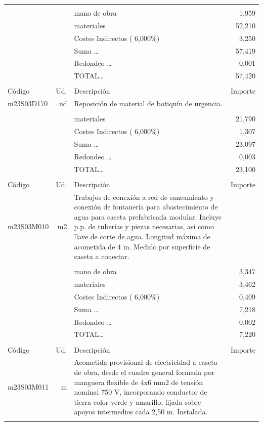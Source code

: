\documentclass{book}%
\begin{document}
\begin{supertabular}{l r p{60mm} r}
&&&\\%
&&mano de obra&     1,959\\%
&&materiales&    52,210\\%
&&Costes Indirectos (     6,000\%)&     3,250\\%
&&Suma \ldots&    57,419\\%
&&Redondeo \ldots&     0,001\\%
%
&&TOTAL\ldots&    57,420\\%
&&&\\%
Código&Ud.&Descripción&Importe\\%
\hline%
m23S03D170&ud&Reposición de material de botiquín de urgencia.&\\%
&&&\\%
&&materiales&    21,790\\%
&&Costes Indirectos (     6,000\%)&     1,307\\%
&&Suma \ldots&    23,097\\%
&&Redondeo \ldots&     0,003\\%
%
&&TOTAL\ldots&    23,100\\%
&&&\\%
Código&Ud.&Descripción&Importe\\%
\hline%
m23S03M010&m2&Trabajos de conexión a red de saneamiento y conexión de fontanería para abastecimiento de agua para caseta prefabricada modular. Incluye p.p. de tuberías y piezas necesarias, así como llave de corte de agua. Longitud máxima de acometida de 4 m. Medido por superficie de caseta a conectar.&\\%
&&&\\%
&&mano de obra&     3,347\\%
&&materiales&     3,462\\%
&&Costes Indirectos (     6,000\%)&     0,409\\%
&&Suma \ldots&     7,218\\%
&&Redondeo \ldots&     0,002\\%
%
&&TOTAL\ldots&     7,220\\%
&&&\\%
Código&Ud.&Descripción&Importe\\%
\hline%
m23S03M011&m&Acometida provisional de electricidad a caseta de obra, desde el cuadro general formada por manguera flexible de 4x6 mm2 de tensión nominal 750 V, incorporando conductor de tierra color verde y amarillo, fijada sobre apoyos intermedios cada 2,50 m. Instalada.&\\%
&&&\\%

\end{supertabular}
\end{document}
